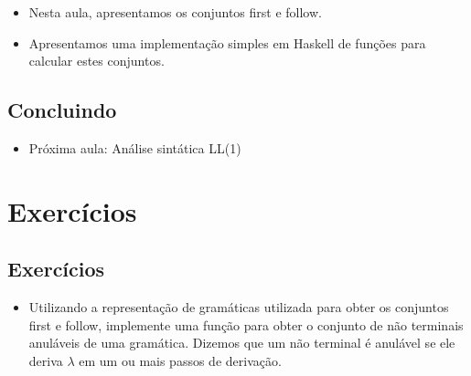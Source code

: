 \documentclass[11pt]{article}
\begin{document}
\begin{itemize}
\item Nesta aula, apresentamos os conjuntos first e follow.

\item Apresentamos uma implementação simples em Haskell de funções para calcular estes conjuntos.
\end{itemize}
\subsection*{Concluindo}
\label{sec:org828a3a2}

\begin{itemize}
\item Próxima aula: Análise sintática LL(1)
\end{itemize}
\section*{Exercícios}
\label{sec:org438f7a3}

\subsection*{Exercícios}
\label{sec:orgd183041}

\begin{itemize}
\item Utilizando a representação de gramáticas utilizada para obter os conjuntos first e follow,
implemente uma função para obter o conjunto de não terminais anuláveis de uma gramática.
Dizemos que um não terminal é anulável se ele deriva \(\lambda\) em um ou mais passos de derivação.
\end{itemize}
\end{document}
